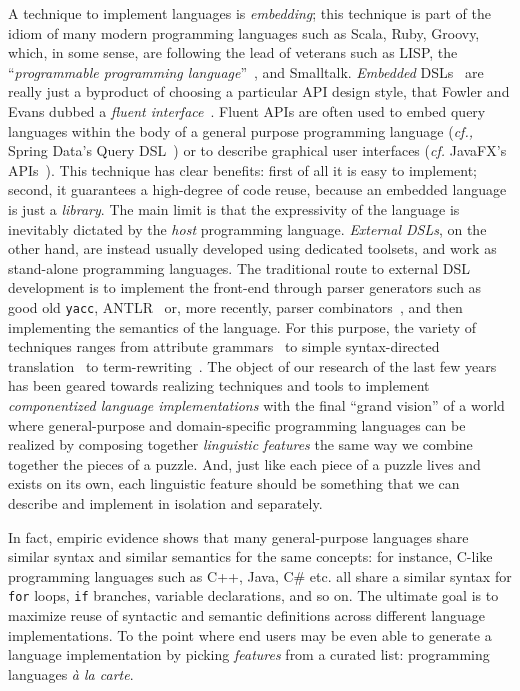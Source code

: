 A technique to implement languages is \textit{embedding}; this technique is part of the idiom of many modern programming languages such as Scala, Ruby, Groovy, which, in some sense, are following the lead of veterans such as LISP, the ``\textit{programmable programming language}''~\cite{Foderaro91}, and Smalltalk. \textit{Embedded} DSLs~\cite{Fowler10} are really just a byproduct of choosing a particular API design style, that Fowler and Evans dubbed a \textit{fluent interface}~\cite{Fowler05b}. Fluent APIs are often used to embed query languages within the body of a general purpose programming language (\textit{cf.,} Spring Data's Query DSL~\cite{Pollack12}) or to describe graphical user interfaces (\textit{cf.} JavaFX's APIs~\cite{Dea14}).
This technique has clear benefits: first of all it is easy to implement; second, it guarantees a high-degree of code reuse, because an embedded language is just a \textit{library}.
The main limit is that the expressivity of the language is inevitably dictated by the \textit{host} programming language. 
\textit{External DSLs}, on the other hand, are instead usually developed using dedicated toolsets, and work as stand-alone programming languages. The traditional route to external DSL development is to implement the front-end through parser generators such as good old \texttt{yacc}, ANTLR~\cite{Parr95} or, more recently, parser combinators~\cite{Swierstra00,Moors08}, and then implementing the semantics of the language. For this purpose, the variety of techniques ranges from attribute grammars~\cite{Knuth68,Paakki95} to simple syntax-directed translation~\cite{Aho86} to term-rewriting~\cite{Visser98}. The object of our research of the last few years has been geared towards realizing techniques and tools to implement \textit{componentized language implementations} with the final ``grand vision'' of a world where general-purpose and domain-specific programming languages can be realized by composing together \textit{linguistic features} the same way we combine together the pieces of a puzzle. And, just like each piece of a puzzle lives and exists on its own, each linguistic feature should be something that we can describe and implement in isolation and separately.

In fact, empiric evidence shows that many general-purpose languages share similar syntax and similar semantics for the same concepts: for instance, C-like programming languages such as C++, Java, C\# etc. all share a similar syntax for \texttt{for} loops,  \texttt{if} branches, variable declarations, and so on. The ultimate goal is to maximize reuse of syntactic and semantic definitions across different language implementations. To the point where end users may be even able to generate a language implementation by picking \textit{features} from a curated list: programming languages \textit{à la carte}. 


